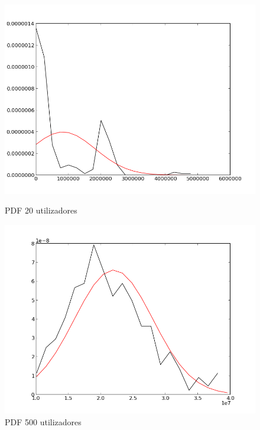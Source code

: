 \documentclass[pdftex,12pt,a4paper]{report}
\begin{document}
\begin{figure}[!htb]
  \centering
  \begin{minipage}[b]{0.4\textwidth}
    \includegraphics[width=\textwidth]{aggregation_effect/empirical_PDF__20_users_.png}
    \caption{PDF 20 utilizadores}
    \label{fig:empirical_20_users}
  \end{minipage}
  \hfill
  \begin{minipage}[b]{0.4\textwidth}
    \includegraphics[width=\textwidth]{aggregation_effect/empirical_PDF__500_users_.png}
    \caption{PDF 500 utilizadores}
    \label{fig:empirical_500_users}
  \end{minipage}
\end{figure}
\end{document}
